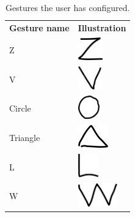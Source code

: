 \begin{table}[h!]
\centering
\caption{Gestures the user has configured.}
\label{tbl:analysis:scenario:gestures}
\begin{tabular}{ll}
\textbf{Gesture name} & \textbf{Illustration}
\\[0.2cm]
Z                     &  
\begin{minipage}{.3\textwidth}
  \includegraphics[height=1cm]{images/gesture-z}
\end{minipage}
\\[0.5cm]
V                     &
\begin{minipage}{.3\textwidth}
  \includegraphics[height=1cm]{images/gesture-v}
\end{minipage}
\\[0.5cm]
Circle                &
\begin{minipage}{.3\textwidth}
  \includegraphics[height=1cm]{images/gesture-circle}
\end{minipage}
\\[0.5cm]
Triangle              &
\begin{minipage}{.3\textwidth}
  \includegraphics[height=1cm]{images/gesture-triangle}
\end{minipage}
\\[0.5cm]
L                     &
\begin{minipage}{.3\textwidth}
  \includegraphics[height=1cm]{images/gesture-l}
\end{minipage}
\\[0.5cm]
W                     &
\begin{minipage}{.3\textwidth}
  \includegraphics[height=1cm]{images/gesture-w}

\end{minipage}
\end{tabular}
\end{table}
